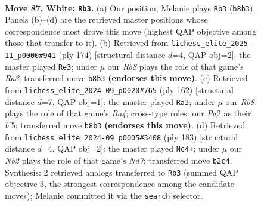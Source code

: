 \documentclass[11pt]{article}
\begin{document}
\clearpage

\begin{figure}[p]\centering
\begin{subfigure}{0.46\textwidth}\centering
\resizebox{\linewidth}{!}{%
\newchessgame
\chessboard[
  setfen={1R6/8/k7/5K2/3r4/8/1N4P1/8 w - - 38 87},
  showmover=false,
  pgfstyle=straightmove, color=movearrow, markmove={b8-b3}
]}
\caption{}
\end{subfigure}\hfill
\begin{subfigure}{0.46\textwidth}\centering
\resizebox{\linewidth}{!}{%
\newchessgame
\chessboard[
  setfen={N7/8/3K4/5k2/8/R7/8/1r6 w - - 17 88},
  showmover=false,
  pgfstyle=straightmove, color=movearrow, markmove={a3-e3}
]}
\caption{}
\end{subfigure}
\\[4pt]
\begin{subfigure}{0.46\textwidth}\centering
\resizebox{\linewidth}{!}{%
\newchessgame
\chessboard[
  setfen={8/8/8/3k1b2/R7/8/7r/3KN3 w - - 6 82},
  showmover=false,
  pgfstyle=straightmove, color=movearrow, markmove={a4-a3}
]}
\caption{}
\end{subfigure}\hfill
\begin{subfigure}{0.46\textwidth}\centering
\resizebox{\linewidth}{!}{%
\newchessgame
\chessboard[
  setfen={8/2R5/8/8/3k4/8/K2n3r/8 b - - 85 92},
  showmover=false,
  pgfstyle=straightmove, color=movearrow, markmove={d2-c4}
]}
\caption{}
\end{subfigure}
\caption{\textbf{Move 87, White: \texttt{Rb3}.} (a) Our position; Melanie plays \texttt{Rb3} (\texttt{b8b3}). Panels (b)--(d) are the retrieved master positions whose correspondence most drove this move (highest QAP objective among those that transfer to it). (b) Retrieved from \texttt{lichess\_elite\_2025-11\_p0000\#941} (ply 174) [structural distance $d$=4, QAP obj=2]: the master played \texttt{Re3}; under $\mu$ our \emph{Rb8} plays the role of that game's \emph{Ra3}; transferred move \texttt{b8b3} \textbf{(endorses this move)}. (c) Retrieved from \texttt{lichess\_elite\_2024-09\_p0020\#765} (ply 162) [structural distance $d$=7, QAP obj=1]: the master played \texttt{Ra3}; under $\mu$ our \emph{Rb8} plays the role of that game's \emph{Ra4}; cross-type roles: our \emph{P}g2 as their \emph{b}f5; transferred move \texttt{b8b3} \textbf{(endorses this move)}. (d) Retrieved from \texttt{lichess\_elite\_2024-09\_p0005\#3408} (ply 183) [structural distance $d$=4, QAP obj=2]: the master played \texttt{Nc4+}; under $\mu$ our \emph{Nb2} plays the role of that game's \emph{Nd7}; transferred move \texttt{b2c4}. Synthesis: 2 retrieved analogs transferred to \texttt{Rb3} (summed QAP objective 3, the strongest correspondence among the candidate moves); Melanie committed it via the \texttt{search} selector.}
\label{fig:thought-m172}
\end{figure}
\end{document}
